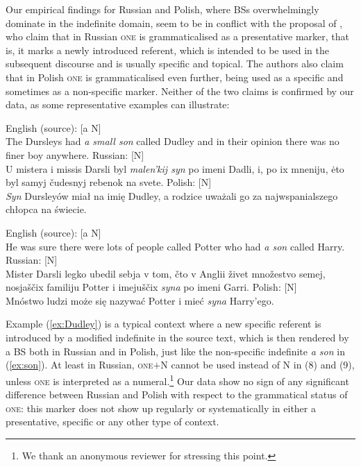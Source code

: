 \documentclass[output=paper,colorlinks,citecolor=brown]{langscibook}
\begin{document}
Our empirical findings for Russian and Polish, where BSs overwhelmingly dominate in the indefinite domain, seem to be in conflict with the proposal of \citet{Hwaszcz.Kedzierska2018}, who claim that in Russian \textsc{one} is grammaticalised as a presentative marker, that is, it marks a newly introduced referent, which is intended to be used in the subsequent discourse and is usually specific and topical. The authors also claim that in Polish \textsc{one} is grammaticalised even further, being used as a specific and sometimes as a non-specific marker. Neither of the two claims is confirmed by our data, as some representative examples can illustrate: 

\ea \label{ex:Dudley} \ea  English (source): [a N]			 \\
The Dursleys had \textit{a small son} called Dudley and in their opinion there was no finer boy anywhere.
\ex  Russian: [N]\\ \label{dudleyru}
U mistera i missis Darsli byl \textit{malen'kij syn} po imeni Dadli, i, po ix mneniju, \.{e}to byl samyj \v{c}udesnyj rebenok na svete. 
\ex Polish: [N] \\ \label{dudleypl}
\textit{Syn} Dursley\'{o}w miał na imię Dudley, a rodzice uważali go za najwspanialszego chłopca na świecie. 
\z\z

\ea \label{ex:son} \ea  English (source): [a N] \\
He was sure there were lots of people called Potter who had \textit{a son} called Harry.
\ex  Russian: [N]\\ \label{sonru}
Mister Darsli legko ubedil sebja v tom, \v{c}to v Anglii \v{z}ivet mno\v{z}estvo semej, nosja\v{s}\v{c}ix familiju Potter i imeju\v{s}\v{c}ix \textit{syna} po imeni Garri.
\ex Polish: [N] \\ \label{sonpl}
Mnóstwo ludzi może się nazywać Potter i mieć \textit{syna} Harry'ego.
\z\z

\noindent Example (\ref{ex:Dudley}) is a typical context where a new specific referent is introduced by a modified indefinite in the source text, which is then rendered by a BS both in Russian and in Polish, just like the non-specific indefinite \textit{a son} in (\ref{ex:son}). At least in Russian, \textsc{one}$+$N cannot be used instead of N in (8) and (9), unless \textsc{one} is interpreted as a numeral.\footnote{We thank an anonymous reviewer for stressing this point.} Our data show no sign of any significant difference between Russian and Polish with respect to the grammatical status of \textsc{one}: this marker does not show up regularly or systematically in either a presentative, specific or any other type of context.
\end{document}
